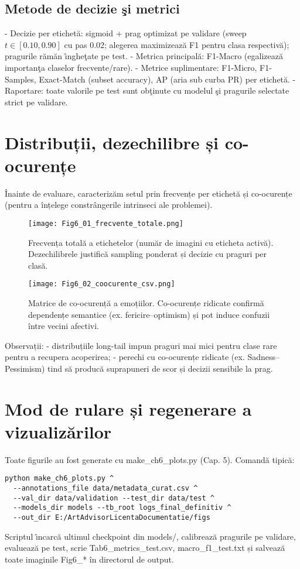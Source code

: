 \subsection{Metode de decizie \c{s}i metrici}
- Decizie per etichet\u{a}: sigmoid + prag optimizat pe validare (sweep $t \in [0.10, 0.90]$ cu pas 0.02; alegerea maximizeaz\u{a} F1 pentru clasa respectiv\u{a}); pragurile r\u{a}m\u{a}n \^{\i}nghe\c{t}ate pe test.
- Metrica principal\u{a}: F1-Macro (egalizeaz\u{a} importan\c{t}a claselor frecvente/rare).
- Metrice suplimentare: F1-Micro, F1-Samples, Exact-Match (subset accuracy), AP (aria sub curba PR) per etichet\u{a}.
- Raportare: toate valorile pe test sunt ob\c{t}inute cu modelul \c{s}i pragurile selectate strict pe validare.

\section{Distribuții, dezechilibre și co-ocurențe}
Înainte de evaluare, caracterizăm setul prin frecvențe per etichetă și co-ocurențe (pentru a înțelege constrângerile intrinseci ale problemei).

\begin{figure}[tb]
  \centering
  \texttt{[image: Fig6\_01\_frecvente\_totale.png]}
  \caption{Frecvența totală a etichetelor (număr de imagini cu eticheta activă). Dezechilibrele justifică sampling ponderat și decizie cu praguri per clasă.}
  \label{fig:c6-frecvente}
\end{figure}

\begin{figure}[tb]
  \centering
  \texttt{[image: Fig6\_02\_coocurente\_csv.png]}
  \caption{Matrice de co-ocurență a emoțiilor. Co-ocurențe ridicate confirmă dependențe semantice (ex. fericire–optimism) și pot induce confuzii între vecini afectivi.}
  \label{fig:c6-cooc}
\end{figure}

\noindent Observații:
- distribuțiile long-tail impun praguri mai mici pentru clase rare pentru a recupera acoperirea;
- perechi cu co-ocurențe ridicate (ex. Sadness–Pessimism) tind să producă suprapuneri de scor și decizii sensibile la prag.

\section{Mod de rulare și regenerare a vizualizărilor}
Toate figurile au fost generate cu make\_ch6\_plots.py (Cap. 5). Comandă tipică:
\begin{verbatim}
python make_ch6_plots.py ^
  --annotations_file data/metadata_curat.csv ^
  --val_dir data/validation --test_dir data/test ^
  --models_dir models --tb_root logs_final_definitiv ^
  --out_dir E:/ArtAdvisorLicentaDocumentatie/figs
\end{verbatim}
Scriptul \^{\i}ncarc\u{a} ultimul checkpoint din models/, calibreaz\u{a} pragurile pe validare, evalueaz\u{a} pe test, scrie Tab6\_metrics\_test.csv, macro\_f1\_test.txt și salveaz\u{a} toate imaginile Fig6\_* în directorul de output.

